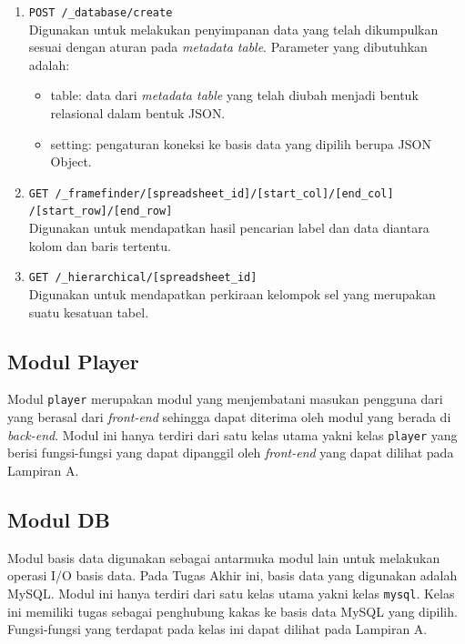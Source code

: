 \begin{enumerate}
	\item \texttt{POST /\_database/create} \\
	      Digunakan untuk melakukan penyimpanan data yang telah dikumpulkan sesuai dengan aturan pada \textit{metadata table}. Parameter yang dibutuhkan adalah:
	      \begin{itemize}
		      \item table: data dari \textit{metadata table} yang telah diubah menjadi bentuk relasional dalam bentuk JSON.
		      \item setting: pengaturan koneksi ke basis data yang dipilih berupa JSON Object.
	      \end{itemize}

	\item \texttt{GET /\_framefinder/[spreadsheet\_id]/[start\_col]/[end\_col]\\/[start\_row]/[end\_row]} \\
	      Digunakan untuk mendapatkan hasil pencarian label dan data diantara kolom dan baris tertentu.

	\item \texttt{GET /\_hierarchical/[spreadsheet\_id]} \\
	      Digunakan untuk mendapatkan perkiraan kelompok sel yang merupakan suatu kesatuan tabel.
\end{enumerate}

\subsection{Modul Player}
Modul \texttt{player} merupakan modul yang menjembatani masukan pengguna dari yang berasal dari \textit{front-end} sehingga dapat diterima oleh modul yang berada di \textit{back-end}. Modul ini hanya terdiri dari satu kelas utama yakni kelas \texttt{player} yang berisi fungsi-fungsi yang dapat dipanggil oleh \textit{front-end} yang dapat dilihat pada Lampiran A.

\subsection{Modul DB}
Modul basis data digunakan sebagai antarmuka modul lain untuk melakukan operasi I/O basis data. Pada Tugas Akhir ini, basis data yang digunakan adalah MySQL. Modul ini hanya terdiri dari satu kelas utama yakni kelas \texttt{mysql}. Kelas ini memiliki tugas sebagai penghubung kakas ke basis data MySQL yang dipilih. Fungsi-fungsi yang terdapat pada kelas ini dapat dilihat pada Lampiran A.


